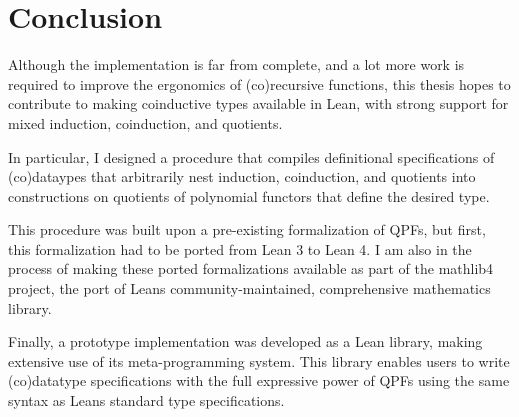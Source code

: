
\chapter{Conclusion}%
\label{ch:conclusion}

Although the implementation is far from complete, and a lot more work is required to improve the ergonomics of (co)recursive functions, this thesis hopes to contribute to making coinductive types available in Lean, with strong support for mixed induction, coinduction, and quotients. 

In particular, I designed a procedure that compiles definitional specifications of (co)dataypes
that arbitrarily nest induction, coinduction, and quotients into constructions on quotients of polynomial functors that define the desired type.

This procedure was built upon a pre-existing formalization of QPFs, but first,
this formalization had to be ported from Lean 3 to Lean 4. I am also in the process of making
these ported formalizations available as part of the mathlib4 project, the port of Leans community-maintained, comprehensive mathematics library.

Finally, a prototype implementation was developed as a Lean library, making extensive use of its meta-programming system.
This library enables users to write (co)datatype specifications with the full expressive power of QPFs using the
same syntax as Leans standard \inductive{} type specifications.